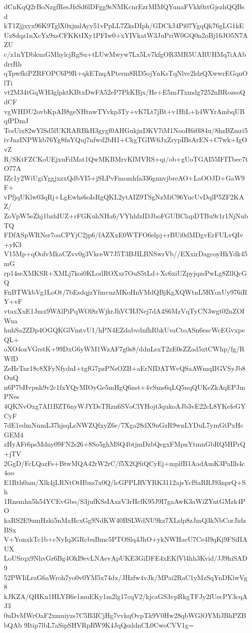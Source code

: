dCnKqQ2rBoNzgfResJfsSd6lDFgg9sNMKcnrEzrMIMQYunaFVkk0ztGjszhQQBsd
kT1Zjjxyx96K9TglX0xjmlAyy51vPpLL7ZksDIph/GDCkJ4Pi07YgqQk76gLG1kE
Uz8dqz1nXcYx9xsCFKKtIXy1PFIw0+xYIVkatW3JuPriW0GQ0n2oBj16JO5N7AZU
c/z1nYDbkuaGMhylcjRgSu+tLUwMwyw7Lx5Lv7kfgOR3MR5UARUHMq7iAAbdrrRh
qTpwfkiPZRFOPC6P9R+qkETnqAPterm8RD5ojYnKsTqNlvc2ldzQXwwrEGqnOlTi
vt2M34tGqWH3glpktKBtxDwFA52eP7PkKBjx/He+E5mJTxmdg7252nBRozsoQdCF
vgWHDU2ovbKpAB8geNHtnwTYvkp3Ty+vK7Lt7jBt+v1HiL+h4WYrAmbqUBqfPDmJ
TcsUix82wYlSd5lUKRARBkH3gygf0AHGukjnDKV7iM1NooH6i0l84u/8hzBZmri5
ivJnzINPWkb76Yg8fnYQuj7nfwd2bH1+CkgTGIW6JxZrypIBsArEN+C7wk+IgOvZ
R/SKtFZCKoUEjxuFdMat1QwMKBMrvKfMVRS+qi/ob+gUoTGAI55IFITbec7tO77A
IZc1y2WiUgiYggjxzxQdbYI5+jSLPvFmomhfa336gnnvjbreAO+LaOOJD+GaW9F+
vPfjqUKlw03qRj+LgEwhs6oIsRgQKL2ytAIZ9TSgNzMiC96YucUvDqlP5ZF2KAZ/
ZoVpW5eZhj1bzhIUZ+rFGKuhNHa6/VYhhfzIDJboFGUBClapDTBu9r1r1NjNubTQ
FDfASpWRNsr7oaCPYjC2jp6/fAZXxE0WTFO6elpj+rBUi0dMDgvErFULvQIv+yK3
V15Mp+qOofvMkaCZvv0g3VkceW7J5T3BJILBNSwrVb//EXxirDagcoyHkYdk45mG
rp14seXMKSR+XMLj7koi0KLodROXxr7OuS5tLd+Xc6xiUZpyjqzsPwLg8ZllQcGQ
FnBTWkbVg1LoOt/7bEsdqjzYfmvnzMKoHnVMdQBjKgXQWtnL5RYoxUy976iRY+vF
vtaxXxE1Jmx9WAlPiPqWOl8zWjkrJhVCHJNej7dA4S6MzVqTyCN3wgt02nZOIWua
huhSa2ZDp4OGQKGlVmtvU1/hPN4EZdabvdnfhRbkUvaCtoASn6escWcEGvxpeQL+
oXO4ozVGrstK+99DxG6yWM1WzAF7g0s8/ddnLsxT2zE0sZZad5xtCWhp/fg/RWfD
ZeHrTnr18c8XFyNfydnI+tgfG7pzPNsOZB+aErNIDATWvQSaAWmqIIGVSyJb8OuQ
n6P7bHvpnh9v2c1fxYQyMIOyGe5mHgQ6nst+4vSms6qLQ5nqQUKeZkAqEPJmPNes
4QKNvOxg7AI1BZT6nyWJYDsTRzn6SVoClYHojt3qukoAJb3vE22cL8YKefeGYCyF
7dE1edmNnmL37hjsqLeNWZQfxyZ6e/7Xga28dX9uGzR9wnLYDuL7ymGtPxHcGEM4
zHyAFr6psMdny09FN2s26+8So5ghMSQ4btjmDzbQegxFMpnYtmnGbRQ5HPrQ+jTV
2GgD/FcLQazFs+BtwMQA42rW2rC/f5X2QSiQCyEj+mplfB1AadAmK3PaIlh4c4oo
E1Rth0am/Xlk4jLRNtOtHbxs7x0Q/lcGPPLRVYRK3112ajsYcfSaRRJ93nprQ+Sh
1Rnsmhn5h54YCEvGbo/S3jufKSsIAxzV3rHcfK95J9I7gaAwK3aWiZYntGMzk4PO
kaRS2E9umHzki5nMxHcxGg9NdKW40BSLWdNU9kz7XLslp8zJmQ3kNbCorJidzBSx
V+YonxkTc1b+cNyIq3GRcbuBmc5PTOSlq4JhO+ykNWHaeU7Ce4l9qKj9FSiIIAUX
LoUSrqx9NhvGr6Bg4OkI9evLNAevApUKE3GiDFE4xEKfVl4hh3Kvid/JJ9hiSAD9
52PWIiLraG6aWroh7yo0v0YM5x74dx/JHzfw4vJk/MPai2RaC1yMzSqYnDKlwVg8
kJKZA/QHKn1HLYB6e1muEKy1m2lg17cqV2/kjcaGS3vpRkgTFJy2fUecPY3cqAJ3
0uDvMWrOaF2xmuiyzs7C5B3ICjHg7vvkqOvpTk9V0Hw28qbWGlOYMiJBhPZBbQAb
9Itip7lbL7aSipSHVRpRW9K4JqQszldnCL0CwoCVV1g=
